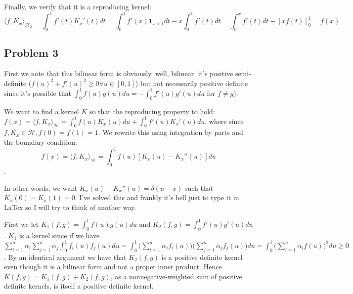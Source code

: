 \documentclass[12pt]{article}
\begin{document}
Finally, we verify that it is a reproducing kernel:
$$\langle f, K_x \rangle_{\mathcal{H}_2} = \int_0^1 f'(t) K_x'(t) dt = \int_0^1 f'(x)\mathbf{1}_{x<t} dt - x\int_0^1f'(t)dt = \int_0^x f'(t) dt - [xf(t)]_0^1 = f(x)$$




\subsection{Problem 3}
First we note that this bilinear form is obviously, well, bilinear, it's positive semi-definite ($f(u)^2 + f'(u)^2 \geq 0 \forall u \in [0,1]$) but not necessarily positive definite since it's possible that $\int_0^1 f(u)g(u) du = -\int_0^1 f'(u)g'(u)du$ for $f \neq g$).

We want to find a kernel $K$ so that the reproducing property to hold: $f(x) = \langle f, K_x \rangle_\mathcal{H} =  \int_0^1 f(u)K_x(u)du + \int_0^1 f'(u)K_x'(u)du$, where since $f, K_x \in \mathcal{H}, f(0) = f(1) = 1$. We rewrite this using integration by parts and the boundary condition:
$$f(x) = \langle f, K_x \rangle_\mathcal{H} = \int_0^1 f(u)[K_x(u) - K_x''(u)]du$$.

In other words, we want $K_x(u) - K_x''(u) = \delta(u-x)$ such that $K_x(0) = K_x(1) = 0$. I've solved this and frankly it's hell just to type it in LaTex so I will try to think of another way.

First we let $K_1(f,g) = \int_0^1 f(u)g(u) du$ and $K_2(f,g) = \int_0^1 f'(u)g'(u) du$. $K_1$ is a kernel %
since if we have $\sum_{i=1}^n \alpha_i\sum_{j=1}^n \alpha_j \int_0^1f_i(u)f_j(u)du = \int_0^1 \big(\sum_{i=1}^n \alpha_i f_i(u) \big) \big(\sum_{j=1}^n \alpha_j f_j(u)\big) du = \int_0^1 \big(\sum_{i=1}^n \alpha_i f(u)\big)^2 du \geq 0$. By an identical argument we have that $K_2(f,g)$ is a positive definite kernel even though it is a bilinear form and not a proper inner product. Hence $K(f,g) = K_1(f,g) + K_2(f,g)$, as a nonnegative-weighted sum of positive definite kernels, is itself a positive definite kernel.
\end{document}
